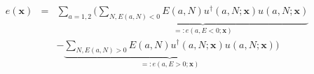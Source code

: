 \begin{equation}
\begin{array}{lcl}
e(\boldsymbol{x}) & = & \sum\limits_{a=1,2} \Big(
\underbrace{\sum\limits_{N,E(a,N)<0}
E(a,N)u^\dagger(a,N;\boldsymbol{x})u(a,N;\boldsymbol{x})}
_{=:e(a,E<0;\boldsymbol{x})} \\
&&  - \underbrace{\sum\limits_{N,E(a,N)>0}
E(a,N)u^\dagger(a,N;\boldsymbol{x})u(a,N;\boldsymbol{x})}
_{=:e(a,E>0;\boldsymbol{x})} \Big)
\end{array}
\end{equation}

